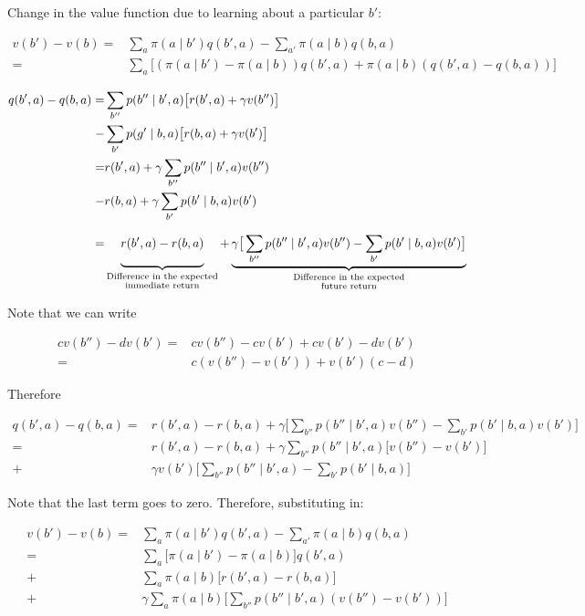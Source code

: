 \documentclass{article}
\begin{document}
    
Change in the value function due to learning about a particular $b'$:

\begin{align}
v(b')-v(b)=&\sum_a \pi(a\mid b')q(b', a)-\sum_{a'} \pi(a\mid b)q(b,a)\\
=&\sum_a\big[ ( \pi(a\mid b')-\pi(a\mid b) )q(b', a) + \pi(a\mid b)(q(b', a)-q(b, a))\big]\nonumber
\end{align}

\begin{align}
q(b', a)-q(b, a)=&\sum_{b''}p(b''\mid b', a)\big[r(b',a) + \gamma v(b'')\big]\\
-&\sum_{b'}p(g'\mid b, a)\big[r(b,a) + \gamma v(b')\big]\nonumber\\
=& r(b',a) + \gamma \sum_{b''}p(b''\mid b', a)v(b'')\nonumber \\
-& r(b,a) + \gamma \sum_{b'}p(b'\mid b, a)v(b')\nonumber \\
=& \underbrace{\vphantom{ \left(\frac{a^{\frac{0.3}{`}}}{b}\right)} r(b',a) - r(b,a)}_{\substack{\text{Difference in the expected} \\ \text{immediate return}}} + \underbrace{\gamma \big[ \sum_{b''}p(b''\mid b', a)v(b'') - \sum_{b'}p(b'\mid b, a)v(b') \big]}_{\substack{\text{Difference in the expected} \\ \text{future return}}}\nonumber
\end{align}

Note that we can write

\begin{align}
cv(b'')-dv(b')=&cv(b'') - cv(b') + cv(b') - dv(b')\\
=&c(v(b'')-v(b')) + v(b')(c-d)\nonumber
\end{align}

Therefore

\begin{align}
q(b', a) - q(b, a) =& r(b',a) - r(b,a) + \gamma \big[ \sum_{b''}p(b''\mid b', a)v(b'') - \sum_{b'}p(b'\mid b, a)v(b') \big]\\
=& r(b', a) - r(b, a) + \gamma \sum_{b''}p(b''\mid b', a)\big[ v(b'')-v(b')\big]\nonumber\\ 
+& \gamma v(b')\big[ \sum_{b''}p(b''\mid b', a) - \sum_{b'}p(b'\mid b, a) \big]\nonumber
\end{align}

Note that the last term goes to zero. Therefore, substituting in:

\begin{align*}
v(b')-v(b)=&\sum_a \pi(a\mid b')q(b', a)-\sum_{a'} \pi(a\mid b)q(b,a)\\
=& \sum_a\big[ \pi(a\mid b')-\pi(a\mid b) \big]q(b', a) \\
+& \sum_{a}\pi(a\mid b)\big[ r(b', a)-r(b, a) \big]\\
+& \gamma\sum_{a}\pi(a\mid b)\big[ \sum_{b''}p(b''\mid b', a) (v(b'')-v(b')) \big]\\
\end{align*}
\end{document}
